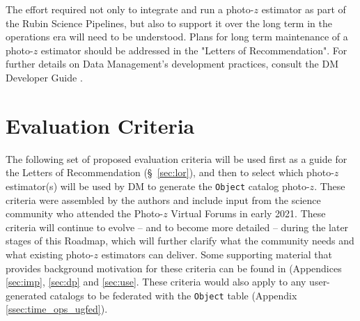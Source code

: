 \documentclass[DM,authoryear,toc]{lsstdoc}
\begin{document}
The effort required not only to integrate and run a photo-$z$ estimator as part of the Rubin Science Pipelines, but also to support it over the long term in the operations era will need to be understood. 
Plans for long term maintenance of a photo-$z$ estimator should be addressed in the "Letters of Recommendation". 
For further details on Data Management's development practices, consult the DM Developer Guide \cite{DevGuide}.


\section{Evaluation Criteria} \label{sec:eval}

The following set of proposed evaluation criteria will be used first as a guide for the Letters of Recommendation (\S~\ref{sec:lor}), and then to select which photo-$z$ estimator(s) will be used by DM to generate the {\tt Object} catalog photo-$z$.
These criteria were assembled by the authors and include input from the science community who attended the Photo-$z$ Virtual Forums in early 2021.
These criteria will continue to evolve -- and to become more detailed -- during the later stages of this Roadmap, which will further clarify what the community needs and what existing photo-$z$ estimators can deliver.
Some supporting material that provides background motivation for these criteria can be found in (Appendices \ref{sec:imp}, \ref{sec:dp} and \ref{sec:use}.
These criteria would also apply to any user-generated catalogs to be federated with the {\tt Object} table (Appendix \ref{ssec:time_ops_ugfed}).
\end{document}
